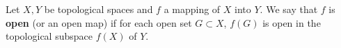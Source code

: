 Let $X, Y$ be topological spaces and $f$ a mapping of $X$ into $Y$. We say that $f$ is \textbf{open} (or an open map) if for each open set $G \subset X$, $f(G)$ is open in the topological subspace $f(X)$ of $Y$.
